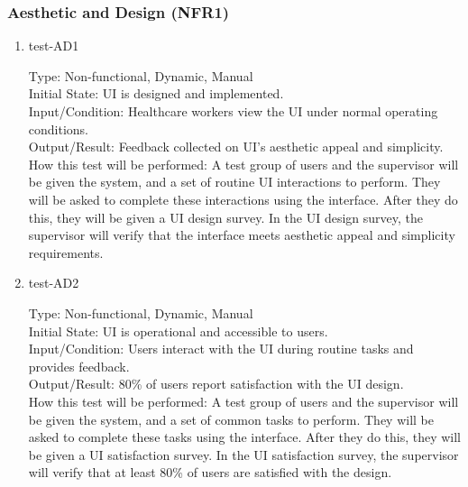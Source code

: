 \documentclass[12pt, titlepage]{article}
\begin{document}
\subsubsection{Aesthetic and Design (NFR1)} \label{section:4.2.1}

\begin{enumerate}
    \item{test-AD1\\} \label{test-AD1}
    
    Type: Non-functional, Dynamic, Manual\\
    
    Initial State: UI is designed and implemented.\\
    
    Input/Condition: Healthcare workers view the UI under normal operating conditions.\\
    
    Output/Result: Feedback collected on UI’s aesthetic appeal and simplicity.\\
    
    How this test will be performed: A test group of users and the supervisor will be given the system, and a set of routine UI interactions to perform. They will be asked to complete these interactions using the interface. After they do this, they will be given a UI design survey. In the UI design survey, the supervisor will verify that the interface meets aesthetic appeal and simplicity requirements.


    \item{test-AD2\\} \label{test-AD2}
    
    Type: Non-functional, Dynamic, Manual\\
    
    Initial State: UI is operational and accessible to users.\\
    
    Input/Condition: Users interact with the UI during routine tasks and provides feedback.\\
    
    Output/Result: 80\% of users report satisfaction with the UI design.\\
    
    How this test will be performed: A test group of users and the supervisor will be given the system, and a set of common tasks to perform. They will be asked to complete these tasks using the interface. After they do this, they will be given a UI satisfaction survey. In the UI satisfaction survey, the supervisor will verify that at least 80\% of users are satisfied with the design.
\end{enumerate}
\end{document}
